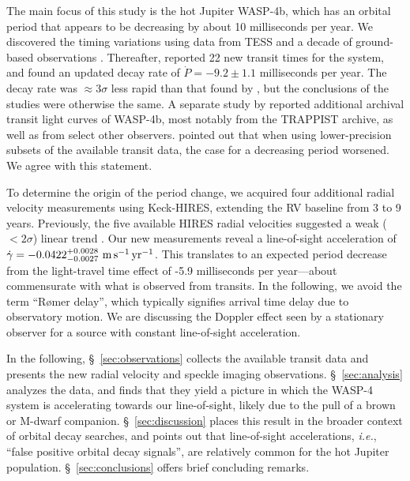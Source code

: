 \documentclass[12pt,twocolumn,tighten]{aastex62}
\begin{document}
The main focus of this study is the hot Jupiter WASP-4b, which has an
orbital period that appears to be decreasing by about 10 milliseconds
per year.  We discovered the timing variations using data from TESS
and a decade of ground-based observations \citep[][hereafter
]{bouma_wasp4b_2019}.  Thereafter,
\citet{southworth_transit_2019} reported 22 new transit times for the
system, and found an updated decay rate of $\dot{P} = -9.2 \pm 1.1$
milliseconds per year. The \citeauthor{southworth_transit_2019} decay rate
was $\approx$3$\sigma$ less rapid than that found by
, but the conclusions of the
studies were otherwise the same.  A separate study by
\citet{baluev_2019} reported additional archival transit light curves
of WASP-4b, most notably from the TRAPPIST archive, as well as from
select other observers.  \citet{baluev_2019} pointed out that
when using lower-precision subsets of the available transit data,
the case for a decreasing period worsened.  We agree with this
statement.

To determine the origin of the period change, we acquired four
additional radial velocity measurements using Keck-HIRES, extending
the RV baseline from 3 to 9 years.  Previously, the five available
HIRES radial velocities suggested a weak ($<2\sigma$) linear trend
\citep{knutson_friends_2014}.  Our new measurements reveal a
line-of-sight acceleration of $\dot{\gamma} =
-0.0422^{+0.0028}_{-0.0027}\ {\rm m\,s^{-1}\,yr^{-1}}$.  This
translates to an expected period decrease from the light-travel time
effect of -5.9 milliseconds per year---about commensurate with what
is observed from transits.  In the following, we avoid the term
``R{\o}mer delay'', which typically signifies arrival time
delay due to observatory motion. We are discussing the Doppler effect
seen by a stationary observer for a source with constant line-of-sight
acceleration.

In the following, \S~\ref{sec:observations} collects the available
transit data and presents the new radial velocity and speckle imaging
observations.  \S~\ref{sec:analysis} analyzes the data, and finds that
they yield a picture in which the WASP-4 system is accelerating
towards our line-of-sight, likely due to the pull of a brown or
M-dwarf companion.
\S~\ref{sec:discussion} places this result in the broader context of
orbital decay searches, and points out that line-of-sight
accelerations, {\it i.e.}, ``false positive orbital decay signals'',
are relatively common for the hot Jupiter population.
\S~\ref{sec:conclusions} offers brief concluding remarks.
\end{document}
